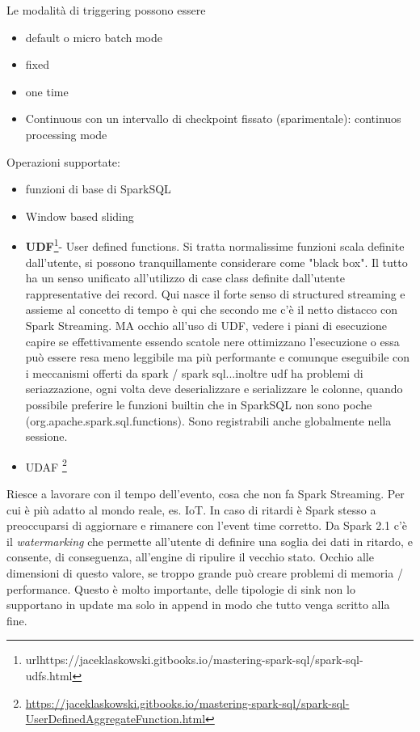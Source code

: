 \documentclass[12pt,italian]{article}
\begin{document}
Le modalità di triggering possono essere
\begin{itemize}
	\item default o micro batch mode
	\item fixed
	\item one time
	\item Continuous con un intervallo di checkpoint fissato (sparimentale): continuos processing mode
\end{itemize}

Operazioni supportate:
\begin{itemize}
	\item funzioni di base di SparkSQL 
	\item Window based sliding
	\item \textbf{UDF}\footnote{url{https://jaceklaskowski.gitbooks.io/mastering-spark-sql/spark-sql-udfs.html}}- User defined functions. Si tratta normalissime funzioni scala definite dall'utente, si possono tranquillamente considerare come "black box". Il tutto ha un senso unificato all'utilizzo di case class definite dall'utente rappresentative dei record. Qui nasce il forte senso di structured streaming e assieme al concetto di tempo è qui che secondo
	me c'è il netto distacco con Spark Streaming. MA occhio all'uso di UDF, vedere i piani di esecuzione capire se effettivamente essendo scatole nere ottimizzano l'esecuzione o essa può essere resa meno leggibile ma più performante e comunque eseguibile con i meccanismi offerti da spark / spark sql...inoltre udf ha problemi di seriazzazione, ogni volta deve deserializzare e serializzare le colonne, quando possibile preferire le funzioni builtin che in SparkSQL non sono poche (org.apache.spark.sql.functions). Sono registrabili anche globalmente nella sessione. %
	\item UDAF \footnote{\url{https://jaceklaskowski.gitbooks.io/mastering-spark-sql/spark-sql-UserDefinedAggregateFunction.html}} %
\end{itemize}

Riesce a lavorare con il tempo dell'evento, cosa che non fa Spark Streaming.
Per cui è più adatto al mondo reale, es. IoT.
In caso di ritardi è Spark stesso a preoccuparsi di aggiornare e rimanere con l'event time corretto.
Da Spark 2.1 c'è il \textit{watermarking} che permette all'utente di definire una soglia dei dati in ritardo, e consente, di conseguenza, all'engine di ripulire il vecchio stato.
Occhio alle dimensioni di questo valore, se troppo grande può creare problemi di memoria / performance. Questo è molto importante, delle tipologie di sink non lo supportano in update ma solo in append in modo  che tutto venga scritto alla fine.
\end{document}
